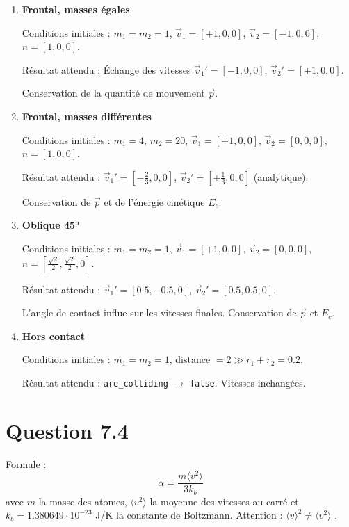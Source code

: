 \documentclass[a4paper]{article}
\begin{document}
    \begin{enumerate}
    \item \textbf{Frontal, masses égales}

    Conditions initiales :  
    $m_1=m_2=1$,  
    $\vec{v}_1=[+1,0,0]$,  
    $\vec{v}_2=[-1,0,0]$,  
    $\hat{n}=[1,0,0]$.

    Résultat attendu :  
    Échange des vitesses  
    $\vec{v}_1'=[-1,0,0]$,  
    $\vec{v}_2'=[+1,0,0]$.  

    Conservation de la quantité de mouvement $\vec{p}$.

    \item \textbf{Frontal, masses différentes}

    Conditions initiales :  
    $m_1=4$, $m_2=20$,  
    $\vec{v}_1=[+1,0,0]$,  
    $\vec{v}_2=[0,0,0]$,  
    $\hat{n}=[1,0,0]$.

    Résultat attendu :  
    $\vec{v}_1'=[-\tfrac{2}{3},0,0]$,  
    $\vec{v}_2'=[+\tfrac{1}{3},0,0]$ (analytique).  

    Conservation de $\vec{p}$ et de l’énergie cinétique $E_c$.

    \item \textbf{Oblique 45°}

    Conditions initiales :  
    $m_1=m_2=1$,  
    $\vec{v}_1=[+1,0,0]$,  
    $\vec{v}_2=[0,0,0]$,  
    $\hat{n}=[\tfrac{\sqrt{2}}{2},\tfrac{\sqrt{2}}{2},0]$.

    Résultat attendu :  
    $\vec{v}_1'=[0.5,-0.5,0]$,  
    $\vec{v}_2'=[0.5,0.5,0]$.  

    L’angle de contact influe sur les vitesses finales.  
    Conservation de $\vec{p}$ et $E_c$.

    \item \textbf{Hors contact}

    Conditions initiales :  
    $m_1=m_2=1$,  
    distance $=2 \gg r_1+r_2=0.2$.

    Résultat attendu :  
    \texttt{are\_colliding} $\rightarrow$ \texttt{false}.  
    Vitesses inchangées.

    \end{enumerate}

\section*{Question 7.4}
    Formule :
    $$\alpha = \frac{m \langle v^2 \rangle}{3k_b}$$
    avec $m$ la masse des atomes, $\langle v^2 \rangle$ la moyenne des vitesses au carré et $k_b = 1.380649 \cdot 10^{-23}$ J/K la constante de Boltzmann.
    Attention : $\langle v \rangle^2 \neq \langle v^2 \rangle$ \quad.\\
\end{document}

